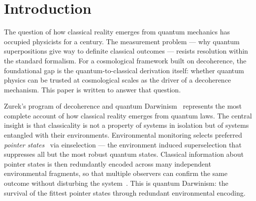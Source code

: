 \documentclass[12pt,a4paper]{article}
\begin{document}
\begin{abstract}
We further present a two-direction derivation of the cosmological information
production rate. A bottom-up derivation from quantum decoherence physics ---
the Joos--Zeh instantaneous decoherence of gravitationally collapsed
structures, integrated over the Press--Schechter halo mass function --- yields
a critical exponent $n = 5/2$. A top-down derivation from the requirement
that the horizon entropy functional reproduce the observed activation function
independently yields the same $n = 5/2$. Their convergence constitutes
a derivation connecting quantum Darwinism to cosmological observables from
two independent directions simultaneously. The effective matter-sector
coupling today is $\mu_0 - 1 = -0.136$, a prediction falsifiable by Euclid
DR1 (October 2026) at projected $3.4\sigma$ sensitivity.
\end{abstract}

\section{Introduction}
\label{sec:intro}

The question of how classical reality emerges from quantum mechanics has
occupied physicists for a century. The measurement problem --- why quantum
superpositions give way to definite classical outcomes --- resists resolution
within the standard formalism. For a cosmological framework built on decoherence, the
foundational gap is the quantum-to-classical derivation itself: whether quantum
physics can be trusted at cosmological scales as the driver of a decoherence
mechanism. This paper is written to answer that question.

Zurek's program of decoherence and quantum Darwinism~\citep{Zurek1981,
Zurek1991,Zurek2003,Zurek2009} represents the most complete account of
how classical reality emerges from quantum laws. The central insight is that
classicality is not a property of systems in isolation but of systems
entangled with their environments. Environmental monitoring selects preferred
\emph{pointer states}~\citep{Zurek1981} via einselection --- the environment
induced superselection that suppresses all but the most robust quantum states.
Classical information about pointer states is then redundantly encoded across
many independent environmental fragments, so that multiple observers can
confirm the same outcome without disturbing the system~\citep{Zurek2009}.
This is quantum Darwinism: the survival of the fittest pointer states through
redundant environmental encoding.
\end{document}
